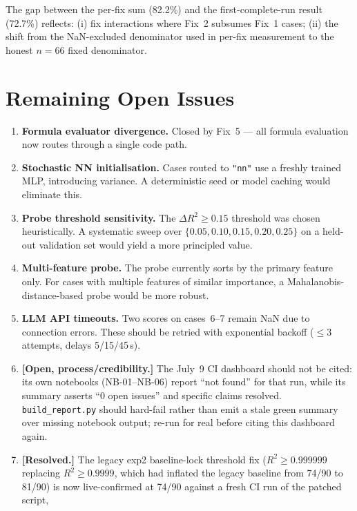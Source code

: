 \documentclass[twoside,11pt]{article}
\begin{document}
The gap between the per-fix sum (82.2\%) and the first-complete-run result
(72.7\%) reflects: (i) fix interactions where Fix~2 subsumes Fix~1 cases;
(ii) the shift from the NaN-excluded denominator used in per-fix measurement
to the honest $n{=}66$ fixed denominator.

\section{Remaining Open Issues}
\label{sec:open_issues}

\begin{enumerate}[leftmargin=*]
  \item \textbf{Formula evaluator divergence.}  Closed by Fix~5 — all formula
    evaluation now routes through a single code path.
  \item \textbf{Stochastic NN initialisation.}  Cases routed to \texttt{"nn"}
    use a freshly trained MLP, introducing variance.  A deterministic seed or
    model caching would eliminate this.
  \item \textbf{Probe threshold sensitivity.}  The $\Delta R^2 \geq 0.15$
    threshold was chosen heuristically.  A systematic sweep over
    $\{0.05, 0.10, 0.15, 0.20, 0.25\}$ on a held-out validation set would
    yield a more principled value.
  \item \textbf{Multi-feature probe.}  The probe currently sorts by the
    primary feature only.  For cases with multiple features of similar
    importance, a Mahalanobis-distance-based probe would be more robust.
  \item \textbf{LLM API timeouts.}  Two scores on cases~6--7 remain NaN
    due to connection errors.  These should be retried with exponential
    backoff ($\leq 3$ attempts, delays 5/15/45\,s).
  \item \textbf{[Open, process/credibility.]} The July~9 CI dashboard
    should not be cited: its own notebooks (NB-01--NB-06) report ``not
    found'' for that run, while its summary asserts ``0 open issues''
    and specific claims resolved. \texttt{build\_report.py} should
    hard-fail rather than emit a stale green summary over missing
    notebook output; re-run for real before citing this dashboard again.
  \item \textbf{[Resolved.]} The legacy exp2 baseline-lock
    threshold fix ($R^2 \geq 0.999999$ replacing $R^2 \geq 0.9999$, which
    had inflated the legacy baseline from 74/90 to 81/90) is now
    live-confirmed at 74/90 against a fresh CI run of the patched script,

\end{enumerate}
\end{document}
